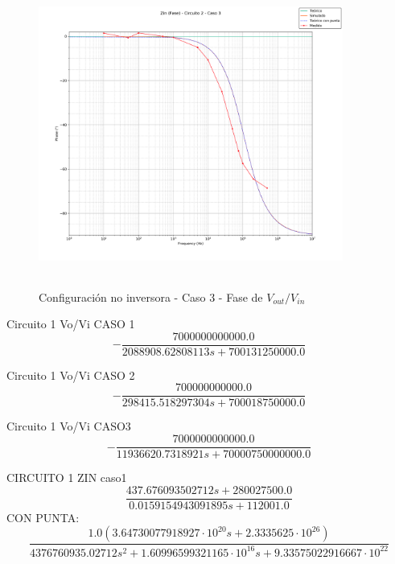 \begin{figure}[H] %
	\centering
	\includegraphics[width=10cm,height=10cm,keepaspectratio]{../EJ1/00GRAFICOS/c2c3/c2c3zinFASE.png}
	\caption{Configuración no inversora - Caso 3 - Fase de $V_{out}/V_{in}$}
	\label{c2c3zinP}
\end{figure}




















Circuito 1 Vo/Vi CASO 1
\begin{equation}
- \frac{7000000000000.0}{2088908.62808113 s + 700131250000.0}
\end{equation}

Circuito 1 Vo/Vi CASO 2
\begin{equation}
- \frac{700000000000.0}{298415.518297304 s + 700018750000.0}
\end{equation}

Circuito 1 Vo/Vi CASO3
\begin{equation}
- \frac{7000000000000.0}{11936620.7318921 s + 70000750000000.0}
\end{equation}

CIRCUITO 1 ZIN
caso1
\begin{equation}
\frac{437.676093502712 s + 280027500.0}{0.0159154943091895 s + 112001.0}
\end{equation}
CON PUNTA:
\begin{equation}
\frac{1.0 \left(3.64730077918927 \cdot 10^{20} s + 2.3335625 \cdot 10^{26}\right)}{4376760935.02712 s^{2} + 1.60996599321165 \cdot 10^{16} s + 9.33575022916667 \cdot 10^{22}}
\end{equation}

